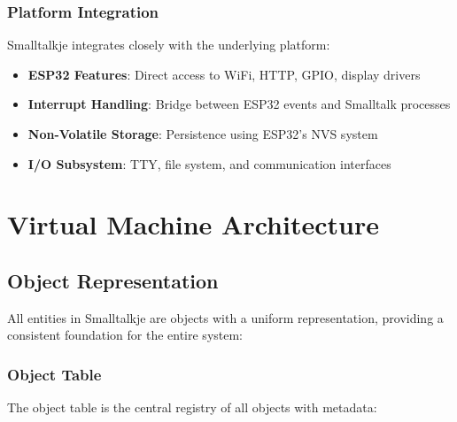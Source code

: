 \documentclass[12pt,a4paper]{report}
\begin{document}
\subsection{Platform Integration}
Smalltalkje integrates closely with the underlying platform:

\begin{itemize}
    \item \textbf{ESP32 Features}: Direct access to WiFi, HTTP, GPIO, display drivers
    \item \textbf{Interrupt Handling}: Bridge between ESP32 events and Smalltalk processes
    \item \textbf{Non-Volatile Storage}: Persistence using ESP32's NVS system
    \item \textbf{I/O Subsystem}: TTY, file system, and communication interfaces
\end{itemize}

\chapter{Virtual Machine Architecture}

\section{Object Representation}
All entities in Smalltalkje are objects with a uniform representation, providing a consistent foundation for the entire system:

\subsection{Object Table}
The object table is the central registry of all objects with metadata:
\end{document}
